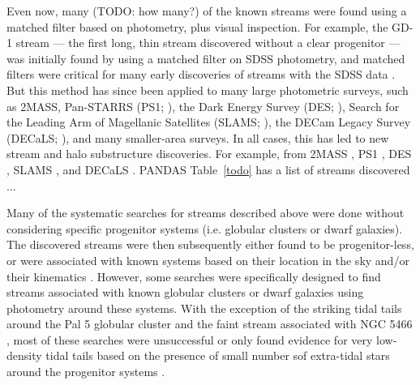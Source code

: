 \documentclass[final,5p,times,twocolumn,authoryear]{elsarticle}
\begin{document}
Even now, many (TODO: how many?) of the known streams were found using a matched filter
based on photometry, plus visual inspection.
For example, the GD-1 stream --- the first long, thin stream discovered without a clear
progenitor --- was initially found by \citet{Grillmair:2006:Detection63Cold} using a matched filter on
SDSS photometry, and matched filters were critical for many early discoveries of streams
with the SDSS data \citep[e.g.,][]{Newberg:2002:GhostSagittariusLumps,Yanny:2003:LowLatitudeHaloStream, Belokurov:2006:FieldStreamsSagittarius, Grillmair:2006:Detection45Tidal}.
But this method has since been applied to many large photometric surveys, such as 2MASS,
Pan-STARRS (PS1; \citealt{todo}), the Dark Energy Survey (DES; \citealt{todo}), Search
for the Leading Arm of Magellanic Satellites (SLAMS; \citealt{todo}), the DECam Legacy
Survey  (DECaLS; \citealt{todo}), and many smaller-area surveys.
In all cases, this has led to new stream and halo substructure discoveries.
For example, from 2MASS \citep{Rocha-Pinto, GASS, Anticenterstream}, PS1
\citep{Bernard, Ophiuchus, others?}, DES \citep{Shipp:2018}, SLAMS \citep{Jethwa:2018},
and DECaLS \citep{Shipp:2021}. PANDAS
Table~\ref{todo} has a list of streams discovered ...

Many of the systematic searches for streams described above were done without
considering specific progenitor systems (i.e. globular clusters or dwarf galaxies).
The discovered streams were then subsequently either found to be progenitor-less, or
were associated with known systems based on their location in the sky and/or their
kinematics \citep{todo}.
However, some searches were specifically designed to find streams associated with known
globular clusters or dwarf galaxies \citep{Grillmair:1990, todo} using photometry around
these systems.
With the exception of the striking tidal tails around the Pal 5 globular cluster and the
faint stream associated with NGC 5466 \citep{todo}, most of these searches were
unsuccessful or only found evidence for very low-density tidal tails based on the
presence of small number sof extra-tidal stars around the progenitor systems
\citep{todo}.
\end{document}
